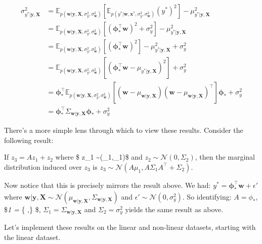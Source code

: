 \documentclass[11pt]{article}
\begin{document}
\begin{align}
\sigma^2_{y^*| \mathbf{y},\mathbf{X}} & =  \mathbb{E}_{p( \mathbf{w} |  \mathbf{y},\mathbf{X},\sigma_y^2,\sigma_{\mathbf{w}}^2)}[ \mathbb{E}_{p(y^* | \mathbf{w} , \mathbf{x}^*, \sigma_y^2,\sigma_{\mathbf{w}}^2)}  (y^*)^2] - \mu_{y^*|\mathbf{y},\mathbf{X}}^2 \\
& = \mathbb{E}_{p( \mathbf{w} |  \mathbf{y},\mathbf{X},\sigma_y^2,\sigma_{\mathbf{w}}^2)}[ (\boldsymbol{\phi}_*^\top \mathbf{w})^2 +\sigma_y^2 ]  - \mu_{y^*|\mathbf{y},\mathbf{X}}^2\\ & = \mathbb{E}_{p( \mathbf{w} |  \mathbf{y},\mathbf{X},\sigma_y^2,\sigma_{\mathbf{w}}^2)}[ (\boldsymbol{\phi}_*^\top \mathbf{w})^2 ] - \mu_{y^*|\mathbf{y},\mathbf{X}}^2 +\sigma_y^2 \\
& = \mathbb{E}_{p( \mathbf{w} |  \mathbf{y},\mathbf{X},\sigma_y^2,\sigma_{\mathbf{w}}^2)}[ (\boldsymbol{\phi}_*^\top \mathbf{w} - \mu_{y^*|\mathbf{y},\mathbf{X}})^2 ] +\sigma_y^2\\
& = \boldsymbol{\phi}_*^\top \mathbb{E}_{p( \mathbf{w} |  \mathbf{y},\mathbf{X},\sigma_y^2,\sigma_{\mathbf{w}}^2)}[(\mathbf{w} - {\mu}_{\mathbf{w}| \mathbf{y},\mathbf{X}})(\mathbf{w} - {\mu}_{\mathbf{w}| \mathbf{y},\mathbf{X}})^\top] \boldsymbol{\phi}_*  + \sigma_y^2\\
& = \boldsymbol{\phi}_*^\top \Sigma_{\mathbf{w}| \mathbf{y},\mathbf{X}} \boldsymbol{\phi}_*  + \sigma_{y}^2
\end{align}

There's a more simple lens through which to view these results. Consider
the following result:

If \(z_3 = A z_1 + z_2\) where \$ z\_1
\sim {}(\mu\_1,\Sigma\_1)\$ and
\(z_2 \sim \mathcal{N}(0,\Sigma_2)\), then the marginal distribution
induced over \(z_3\) is
\(z_3 \sim \mathcal{N}(A \mu_1,A \Sigma_1 A^{\top} + \Sigma_2)\).

Now notice that this is precisely mirrors the result above. We had:
\(y^* = \boldsymbol{\phi}_*^\top \mathbf{w} + \epsilon'\) where
\(\mathbf{w} | \mathbf{y},\mathbf{X} \sim \mathcal{N}(\mu_{\mathbf{w}| \mathbf{y},\mathbf{X}}, \Sigma_{\mathbf{w}| \mathbf{y},\mathbf{X}})\)
and \(\epsilon' \sim \mathcal{N}(0,\sigma_y^2)\). So identifying:
\(A = \phi_*\), \$\mu\emph{1 = \mu}\{\textbar{}
,\} \$,
\(\Sigma_1 = \Sigma_{\mathbf{w}| \mathbf{y},\mathbf{X}}\) and
\(\Sigma_2 = \sigma_y^2\) yields the same result as above.

Let's implement these results on the linear and non-linear datasets,
starting with the linear dataset.
\end{document}
